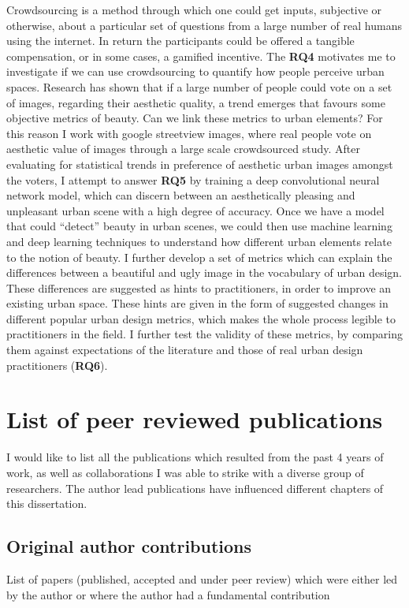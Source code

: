 Crowdsourcing is a method through which one could get inputs, subjective or otherwise, about a particular set of questions from a large number of real humans using the internet. In return the participants could be offered a tangible compensation, or in some cases, a gamified incentive. 
The \textbf{RQ4} motivates me to investigate if we can use crowdsourcing to quantify how people perceive urban spaces. Research has shown that if a large number of people could vote on a set of images, regarding their aesthetic quality, a trend emerges that favours some objective metrics of beauty\cite{datta2008algorithmic,quercia2014aesthetic}. Can we link these metrics to urban elements? For this reason I work with google streetview images, where real people vote on aesthetic value of images through a large scale crowdsourced study. After evaluating for statistical trends in preference of aesthetic urban images amongst the voters,
I attempt to answer \textbf{RQ5} by training a deep convolutional neural network model, which can discern between an aesthetically pleasing and unpleasant urban scene with a high degree of accuracy. Once we have a model that could ``detect'' beauty in urban scenes, we could then use machine learning and deep learning techniques to understand how different urban elements relate to the notion of beauty. I further develop a set of metrics which can explain the differences between a beautiful and ugly image in the vocabulary of urban design. These differences are suggested as hints to practitioners, in order to improve an existing urban space. These hints are given in the form of suggested changes in different popular urban design metrics, which makes the whole process legible to practitioners in the field. I further test the validity of these metrics, by comparing them against expectations of the literature and those of real urban design practitioners (\textbf{RQ6}).

\section{List of peer reviewed publications}

I would like to list all the publications which resulted from the past 4 years of work, as well as collaborations I was able to strike with a diverse group of researchers. The author lead publications have influenced different chapters of this dissertation.

\subsection{Original author contributions}
List of papers (published, accepted and under peer review) which were either led by the author or where the author had a fundamental contribution

